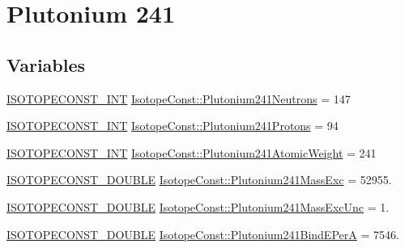 \hypertarget{group___isotope_const-_plutonium-_pu241}{}\section{Plutonium 241}
\label{group___isotope_const-_plutonium-_pu241}
\subsection*{Variables}
\begin{DoxyCompactItemize}
\item 
\mbox{\hyperlink{group___isotope_const-_macros_ga5f18360b3e99483a35c32d789e62621c}{I\+S\+O\+T\+O\+P\+E\+C\+O\+N\+S\+T\+\_\+\+I\+NT}} \mbox{\hyperlink{group___isotope_const-_plutonium-_pu241_gacb266b6a2edfa73aa4273e365d7c1e59}{Isotope\+Const\+::\+Plutonium241\+Neutrons}} = 147
\item 
\mbox{\hyperlink{group___isotope_const-_macros_ga5f18360b3e99483a35c32d789e62621c}{I\+S\+O\+T\+O\+P\+E\+C\+O\+N\+S\+T\+\_\+\+I\+NT}} \mbox{\hyperlink{group___isotope_const-_plutonium-_pu241_ga0245d2a185734978bd640f5c510939c2}{Isotope\+Const\+::\+Plutonium241\+Protons}} = 94
\item 
\mbox{\hyperlink{group___isotope_const-_macros_ga5f18360b3e99483a35c32d789e62621c}{I\+S\+O\+T\+O\+P\+E\+C\+O\+N\+S\+T\+\_\+\+I\+NT}} \mbox{\hyperlink{group___isotope_const-_plutonium-_pu241_gac76ecdc63e723a2dd29f973cbecbda40}{Isotope\+Const\+::\+Plutonium241\+Atomic\+Weight}} = 241
\item 
\mbox{\hyperlink{group___isotope_const-_macros_ga8f45a7272ce02c0b4c65c44636ed719a}{I\+S\+O\+T\+O\+P\+E\+C\+O\+N\+S\+T\+\_\+\+D\+O\+U\+B\+LE}} \mbox{\hyperlink{group___isotope_const-_plutonium-_pu241_gaf0882dec94199502b1de0268f6112b46}{Isotope\+Const\+::\+Plutonium241\+Mass\+Exc}} = 52955.
\item 
\mbox{\hyperlink{group___isotope_const-_macros_ga8f45a7272ce02c0b4c65c44636ed719a}{I\+S\+O\+T\+O\+P\+E\+C\+O\+N\+S\+T\+\_\+\+D\+O\+U\+B\+LE}} \mbox{\hyperlink{group___isotope_const-_plutonium-_pu241_gae9fbe7c68adfda559a1932a2ec3788ee}{Isotope\+Const\+::\+Plutonium241\+Mass\+Exc\+Unc}} = 1.
\item 
\mbox{\hyperlink{group___isotope_const-_macros_ga8f45a7272ce02c0b4c65c44636ed719a}{I\+S\+O\+T\+O\+P\+E\+C\+O\+N\+S\+T\+\_\+\+D\+O\+U\+B\+LE}} \mbox{\hyperlink{group___isotope_const-_plutonium-_pu241_ga4c1036d3a51572d4b7813d3652d5b80b}{Isotope\+Const\+::\+Plutonium241\+Bind\+E\+PerA}} = 7546.
\item 

\end{DoxyCompactItemize}
